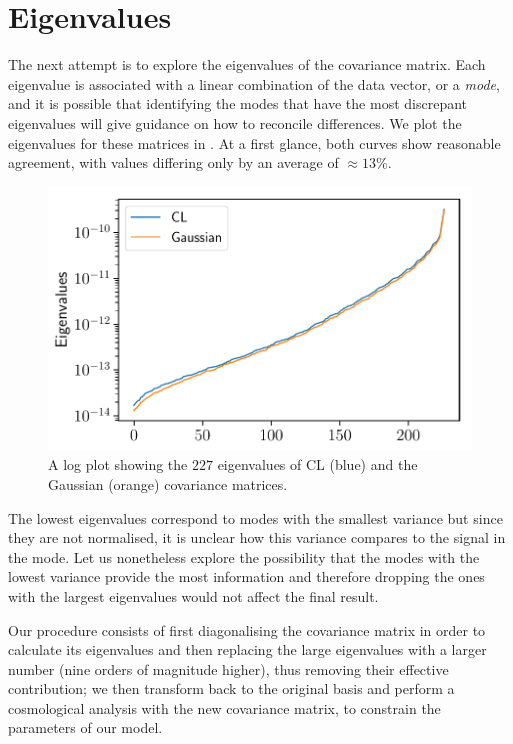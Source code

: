 \documentclass[twocolumn]{\docclass}
\begin{document}
	\section{Eigenvalues}
	\label{sec:eigen}
	
	The next attempt is to explore the eigenvalues of the covariance matrix. Each eigenvalue is associated with a linear combination of the data vector, or a \emph{mode}, and it is possible that identifying the modes that have the most discrepant eigenvalues will give guidance on how to reconcile differences.  We plot the eigenvalues for these matrices in . At a first glance, both curves show reasonable agreement, with values differing only by an average of $\approx 13\%$.
	
	
	\begin{figure}
		\includegraphics[width=0.9\columnwidth]{Eigenvalues/Eigenvalues_Y1_BJ-DES.pdf}
		\caption{A log plot showing the $227$ eigenvalues of CL (blue) and the Gaussian (orange) covariance matrices. \label{fig:coveigen}}
	\end{figure}
	
	
	The lowest eigenvalues correspond to modes with the smallest variance but since they are not normalised, it is unclear how this variance compares to the signal in the mode. Let us nonetheless explore the possibility that the modes with the lowest variance provide the most information and therefore dropping the ones with the largest eigenvalues would not affect the final result.
	
	Our procedure consists of first diagonalising the covariance matrix in order to calculate its eigenvalues and then replacing the large eigenvalues with a larger number (nine orders of magnitude higher), thus removing their effective contribution; we then transform back to the original basis and perform a cosmological analysis with the new covariance matrix, to constrain the parameters of our model. 
	
\end{document}
